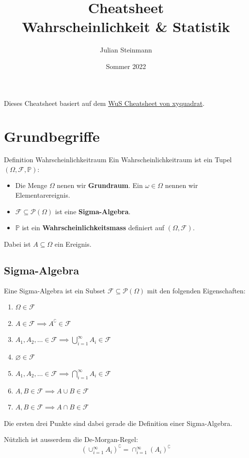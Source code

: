 \documentclass[a4paper,10pt]{article}
\title{Cheatsheet\\ Wahrscheinlichkeit \& Statistik}
\author{Julian Steinmann}
\date{\vspace{-10pt}Sommer 2022}
\def\P{\mathbb{P}}
\def\F{\mathcal{F}}
\begin{document}


Dieses Cheatsheet basiert auf dem \href{https://github.com/XYQuadrat/eth-cheatsheets}{WuS Cheatsheet von xyquadrat}.

\section{Grundbegriffe}
\begin{subbox}{Definition Wahrscheinlichkeitraum}
	Ein Wahrscheinlichkeitraum ist ein Tupel \((\Omega, \F, \P)\):
	\begin{itemize}
		\item Die Menge \(\Omega\) nenen wir \textbf{Grundraum}. Ein \(\omega \in \Omega\) nennen wir Elementarereignis.
		\item \(\F \subseteq \mathcal{P}(\Omega)\) ist eine \textbf{Sigma-Algebra}.
		\item \(\P\) ist ein \textbf{Wahrscheinlichkeitsmass} definiert auf \((\Omega, \F)\).
	\end{itemize}
	Dabei ist \(A \subseteq \Omega\) ein Ereignis.
\end{subbox}

\subsection{Sigma-Algebra}
Eine Sigma-Algebra ist ein Subset \(\F \subseteq \mathcal{P}(\Omega)\) mit den folgenden Eigenschaften:
\begin{enumerate}
	\item \(\Omega \in \F\)
	\item \(A \in \F \implies A^\complement \in \F\)
	\item \(A_1, A_2, \ldots \in \F \implies \bigcup_{i=1}^\infty A_i \in \F\)
	\item \(\varnothing \in \F\)
	\item \(A_1, A_2, \ldots \in \F \implies \bigcap_{i=1}^\infty A_i \in \F\)
	\item \(A, B \in \F \implies A \cup B \in \F\)
	\item \(A, B \in \F \implies A \cap B \in \F\)
\end{enumerate}
Die ersten drei Punkte sind dabei gerade die Definition einer Sigma-Algebra.

Nützlich ist ausserdem die De-Morgan-Regel: \[(\cup_{i=1}^\infty A_i)^\complement = \cap_{i=1}^\infty(A_i)^\complement\]
\end{document}

